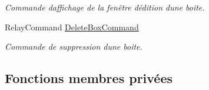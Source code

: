 \begin{DoxyCompactItemize}
\begin{DoxyCompactList}\small\item\em Commande d\textquotesingle{}affichage de la fenêtre d\textquotesingle{}édition d\textquotesingle{}une boite. \end{DoxyCompactList}\item 
Relay\+Command \hyperlink{class_boxes_1_1_view_models_1_1_box_view_model_a066ae0af03eb9916946d060252f46b0a}{Delete\+Box\+Command}
\begin{DoxyCompactList}\small\item\em Commande de suppression d\textquotesingle{}une boite. \end{DoxyCompactList}\end{DoxyCompactItemize}
\subsection*{Fonctions membres privées}
